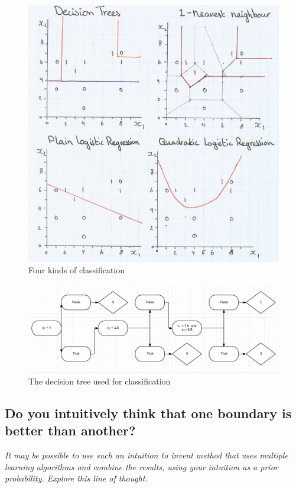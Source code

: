 \documentclass{article}
\begin{document}
\begin{figure} 
	\includegraphics[width=\linewidth]{classification.JPG}
	\caption{Four kinds of classification}
	\label{fig:classification}
\end{figure}


\begin{figure}
	\includegraphics[width=\linewidth]{decisiontree.jpg}
	\caption{The decision tree used for classification}
	\label{fig:decistree}
\end{figure}

\pagebreak

\subsection{Do you intuitively think that one boundary is better than another?}
\textit{It may be possible to use such an intuition to invent method that uses
multiple learning algorithms and combine the results, using your intuition as a prior
probability. Explore this line of thought.}
\end{document}
